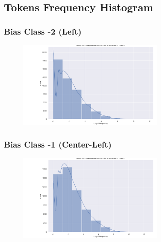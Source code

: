 \documentclass[11pt]{article}
\begin{document}
\pagebreak

\subsection{Tokens Frequency Histogram}
\subsubsection{Bias Class -2 (Left)}
\begin{center}


\TTTFIDFTable
\begin{figure}[h!]
  \includegraphics[width=0.65\textwidth]{figs/words_histogram/hist_token_-2.png}
\end{figure}
\end{center}

\pagebreak

\subsubsection{Bias Class -1 (Center-Left)}
\begin{center}


\TTTFIDFTable
\begin{figure}[h!]
  \includegraphics[width=0.65\textwidth]{figs/words_histogram/hist_token_-1.png}
\end{figure}
\end{center}
\end{document}
